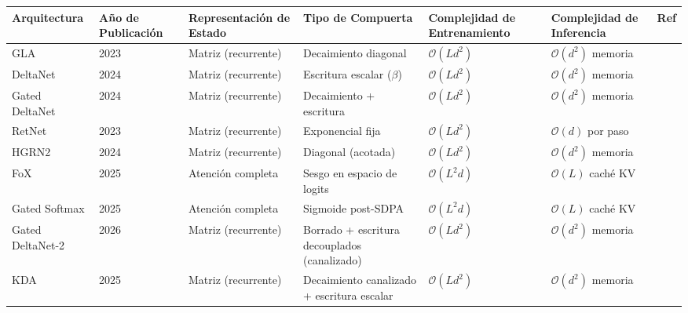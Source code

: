 \footnotesize
\begin{longtable}{p{1.8cm}p{1.7cm}p{1.8cm}p{1.6cm}p{2.0cm}p{2.4cm}p{1.3cm}}
\toprule
\textbf{Arquitectura} & \textbf{Año de Publicación} & \textbf{Representación de Estado} & \textbf{Tipo de Compuerta} & \textbf{Complejidad de Entrenamiento} & \textbf{Complejidad de Inferencia} & \textbf{Ref} \\
\midrule
\endhead
GLA & 2023 & Matriz (recurrente) & Decaimiento diagonal & $\mathcal{O}(Ld^2)$ & $\mathcal{O}(d^2)$ memoria & \citep{yang_gla_2023} \\
DeltaNet & 2024 & Matriz (recurrente) & Escritura escalar ($\beta$) & $\mathcal{O}(Ld^2)$ & $\mathcal{O}(d^2)$ memoria & \citep{yang_deltanet_2024} \\
Gated DeltaNet & 2024 & Matriz (recurrente) & Decaimiento + escritura & $\mathcal{O}(Ld^2)$ & $\mathcal{O}(d^2)$ memoria & \citep{yang_gated_deltanet_2024} \\
RetNet & 2023 & Matriz (recurrente) & Exponencial fija & $\mathcal{O}(Ld^2)$ & $\mathcal{O}(d)$ por paso & \citep{sun_retentive_2023} \\
HGRN2 & 2024 & Matriz (recurrente) & Diagonal (acotada) & $\mathcal{O}(Ld^2)$ & $\mathcal{O}(d^2)$ memoria & \citep{qin_hgrn2_2024} \\
FoX & 2025 & Atención completa & Sesgo en espacio de logits & $\mathcal{O}(L^2d)$ & $\mathcal{O}(L)$ caché KV & \citep{lin_forgetting_transformer_2025} \\
Gated Softmax & 2025 & Atención completa & Sigmoide post-SDPA & $\mathcal{O}(L^2d)$ & $\mathcal{O}(L)$ caché KV & \citep{qiu_gated_attention_2025} \\
Gated DeltaNet-2 & 2026 & Matriz (recurrente) & Borrado + escritura decouplados (canalizado) & $\mathcal{O}(Ld^2)$ & $\mathcal{O}(d^2)$ memoria & \citep{hatamizadeh_gated_deltanet2_2026} \\
KDA & 2025 & Matriz (recurrente) & Decaimiento canalizado + escritura escalar & $\mathcal{O}(Ld^2)$ & $\mathcal{O}(d^2)$ memoria & \citep{kimi_kda_2025} \\
\bottomrule
\end{longtable}
\normalsize

\medskip

